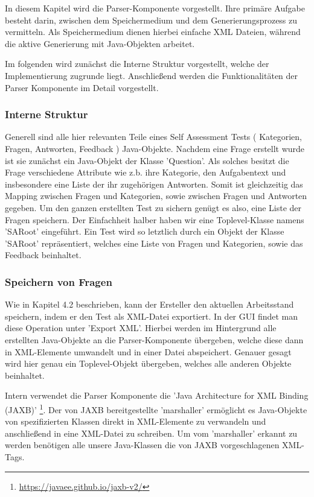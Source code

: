 \label{Tim}
In diesem Kapitel wird die Parser-Komponente vorgestellt.
Ihre primäre Aufgabe besteht darin, zwischen dem Speichermedium und dem Generierungsprozess zu vermitteln.
Als Speichermedium dienen hierbei einfache XML Dateien, während die aktive Generierung mit Java-Objekten arbeitet.

Im folgenden wird zunächst die Interne Struktur vorgestellt, welche der Implementierung zugrunde liegt. Anschließend werden die Funktionalitäten der Parser Komponente im Detail vorgestellt. 

\subsubsection{Interne Struktur}
Generell sind alle hier relevanten Teile eines Self Assessment Tests ( Kategorien, Fragen, Antworten, Feedback ) Java-Objekte. 
Nachdem eine Frage erstellt wurde ist sie zunächst ein Java-Objekt der Klasse 'Question'.
Als solches besitzt die Frage verschiedene Attribute wie z.b. ihre Kategorie, den Aufgabentext und insbesondere eine Liste der ihr zugehörigen Antworten.
Somit ist gleichzeitig das Mapping zwischen Fragen und Kategorien, sowie zwischen Fragen und Antworten gegeben.
Um den ganzen erstellten Test zu sichern genügt es also, eine Liste der Fragen speichern.
Der Einfachheit halber haben wir eine Toplevel-Klasse namens 'SARoot' eingeführt. 
Ein Test wird so letztlich durch ein Objekt der Klasse 'SARoot' repräsentiert, welches eine Liste von Fragen und Kategorien, sowie das Feedback beinhaltet.   

\subsubsection{Speichern von Fragen}
Wie in Kapitel 4.2 beschrieben, kann der Ersteller den aktuellen Arbeitsstand speichern, indem er den Test als XML-Datei exportiert.
In der GUI findet man diese Operation unter 'Export XML'.
Hierbei werden im Hintergrund alle erstellten Java-Objekte an die Parser-Komponente übergeben, welche diese dann in XML-Elemente umwandelt und in einer Datei abspeichert.
Genauer gesagt wird hier genau ein Toplevel-Objekt übergeben, welches alle anderen Objekte beinhaltet.

Intern verwendet die Parser Komponente die 'Java Architecture for XML Binding (JAXB)'
\footnote{\url{https://javaee.github.io/jaxb-v2/}\label{JAXB}}.
Der von JAXB bereitgestellte 'marshaller' ermöglicht es Java-Objekte von spezifizierten Klassen direkt in XML-Elemente zu verwandeln und anschließend in eine XML-Datei zu schreiben.
Um vom 'marshaller' erkannt zu werden benötigen alle unsere Java-Klassen die von JAXB vorgeschlagenen XML-Tags.

